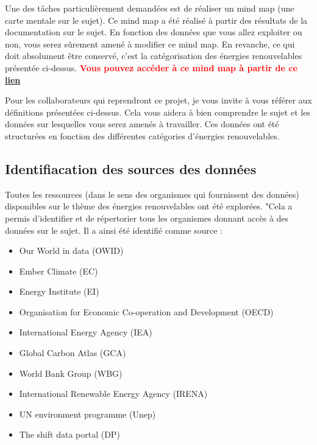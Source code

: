 \documentclass[12pt]{article}
\begin{document}
Une des tâches particulièrement demandées est de réaliser un mind map (une carte mentale sur le sujet). 
Ce mind map a été réalisé à partir des résultats de la documentation sur le sujet. En fonction des 
données que vous allez exploiter ou non, vous serez sûrement amené à modifier ce mind map. En revanche, 
ce qui doit absolument être conservé, c'est la catégorisation des énergies renouvelables présentée ci-dessus. \textcolor{red}{\textbf{Vous pouvez accéder à ce mind map à partir de ce \href{https://drive.google.com/file/d/1h-JnPC5I5Rs3szj3WYrmqPE9UIVYSerr/view?usp=drive_link}{lien}}} \newline

Pour les collaborateurs qui reprendront ce projet, je vous invite à vous référer aux 
définitions présentées ci-dessus. Cela vous aidera à bien comprendre le sujet et les 
données sur lesquelles vous serez amenés à travailler. Ces données ont été structurées 
en fonction des différentes catégories d'énergies renouvelables.



\subsection{Identifiacation des sources des données}


Toutes les ressources (dans le sens des organismes qui fournissent des données) 
disponibles sur le thème des énergies renouvelables ont été explorées. 
"Cela a permis d'identifier 
et de répertorier tous les organismes donnant accès à des données sur le sujet. 
Il a ainsi été identifié comme source : \newline

\begin{itemize}
    \renewcommand{\labelitemi}{-}
    \item Our World in data (OWID)
    \item Ember Climate (EC)
    \item Energy Institute (EI)
    \item Organisation for Economic Co-operation and Development (OECD)
    \item International Energy Agency (IEA)
    \item Global Carbon Atlas (GCA)
    \item World Bank Group  (WBG)
    \item International Renewable Energy Agency (IRENA)
    \item UN environment programme (Unep)
    \item The shift data portal (DP)

\end{itemize}
\end{document}
